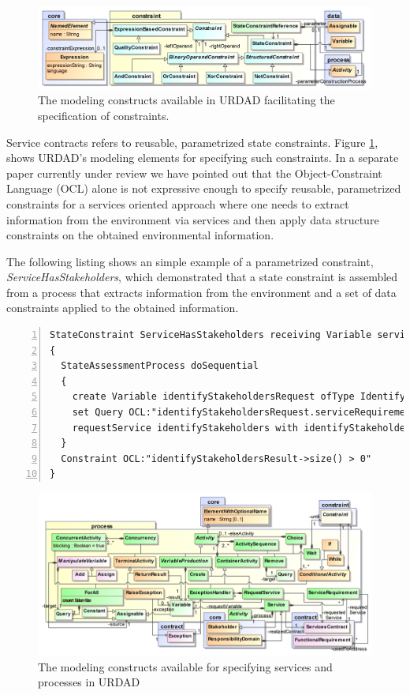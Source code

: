 \begin{figure}[Htbp]
  \centering
  \includegraphics{constraint}
  \caption{The modeling constructs available in URDAD facilitating the specification of constraints.}
  \label{fig:constraintModule}
\end{figure}

Service contracts refers to reusable, parametrized state constraints. Figure \ref{fig:constraintModule}, shows URDAD's modeling elements for specifying such constraints. In a separate paper currently under review we have pointed out that the Object-Constraint Language (OCL)\cite{_object_2010}  alone is not expressive enough to specify reusable, parametrized constraints for a services oriented approach where one needs to extract information from the environment via services and then apply data structure constraints on the obtained environmental information.

The following listing shows an simple example of a parametrized constraint, \emph{ServiceHasStakeholders}, which demonstrated that a state constraint is assembled from a process that extracts information from the environment and a set of data constraints applied to the obtained information.
\lstset{language=urdad,caption=Specifying a state constraint in the URDAD text grammar.,label=processTextSyntax}
\begin{lstlisting}[numbers=left,escapechar=|]
StateConstraint ServiceHasStakeholders receiving Variable serviceRequirements ofType _ServiceRequirements 
{
  StateAssessmentProcess doSequential 
  {
    create Variable identifyStakeholdersRequest ofType IdentifyStakeholdersRequest
    set Query OCL:"identifyStakeholdersRequest.serviceRequirements" equalTo Query OCL:"serviceRequirements"
    requestService identifyStakeholders with identifyStakeholdersRequest yielding Variable identifyStakeholdersResult ofType IdentifyStakeholdersResult
  }
  Constraint OCL:"identifyStakeholdersResult->size() > 0"
}
\end{lstlisting}

\begin{figure}[Htbp]
  \centering
  \includegraphics{process}
  \caption{The modeling constructs available for specifying services and processes in URDAD}
  \label{fig:processModule}
\end{figure}

